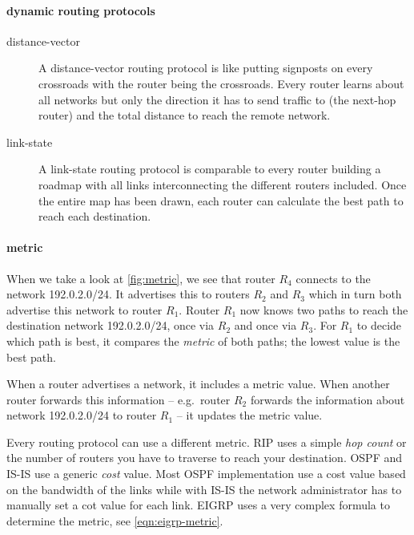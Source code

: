 \paragraph{dynamic routing protocols}
\begin{description}
\item[distance-vector]
A distance-vector routing protocol is like putting signposts on every crossroads with the router being the crossroads.
Every router learns about all networks but only the direction it has to send traffic to (the next-hop router) and the total distance to reach the remote network.
\item[link-state]
A link-state routing protocol is comparable to every router building a roadmap with all links interconnecting the different routers included.
Once the entire map has been drawn, each router can calculate the best path to reach each destination.
\end{description}

\paragraph{metric}
When we take a look at \vref{fig:metric}, we see that router $R_4$ connects to the network 192.0.2.0/24.
It advertises this to routers $R_2$ and $R_3$ which in turn both advertise this network to router $R_1$.
Router $R_1$ now knows two paths to reach the destination network 192.0.2.0/24, once via $R_2$ and once via $R_3$.
For $R_1$ to decide which path is best, it compares the \emph{metric} of both paths; the lowest value is the best path.

When a router advertises a network, it includes a metric value.
When another router forwards this information -- e.g.~router $R_2$ forwards the information about network 192.0.2.0/24 to router $R_1$ -- it updates the metric value.

Every routing protocol can use a different metric.
\acs{RIP} uses a simple \emph{hop count} or the number of routers you have to traverse to reach your destination.
\acs{OSPF} and \acs{IS-IS} use a generic \emph{cost} value.
Most \acs{OSPF} implementation use a cost value based on the bandwidth of the links while with \acs{IS-IS} the network administrator has to manually set a cot value for each link.
\acs{EIGRP} uses a very complex formula to determine the metric, see \vref{eqn:eigrp-metric}.

